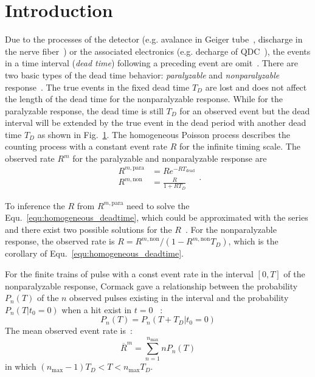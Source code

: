 \section{Introduction}

Due to the processes of the detector (e.g. avalance in Geiger tube~\cite{}, discharge in the nerve fiber~\cite{miller:1985algorithms,bi:1989closedform,}) or the associated electronics (e.g. decharge of QDC~\cite{}), the events in a time interval (\textit{dead time}) following a preceding event are omit~\cite{Knoll:2000fj}. 
There are two basic types of the dead time behavior: \textit{paralyzable} and \textit{nonparalyzable} response~\cite{müller1973deadtime,muller:1994,Knoll:2000fj}. The true events in the fixed dead time $T_D$ are lost and does not affect the length of the dead time for the nonparalyzable response. While for the paralyzable response, the dead time is still $T_D$ for an observed event but the dead interval will be extended by the true event in the dead period with another dead time $T_D$ as shown in Fig.~\ref{}.
The homogeneous Poisson process describes the counting process with a constant event rate $R$ for the infinite timing scale. The observed rate $R^m$ for the paralyzable and nonparalyzable response are~\cite{muller:1994}
\begin{equation}
\begin{aligned}
	R^{m,\mathrm{para}}&=Re^{-RT_\mathrm{dead}}\\
	R^{m,\mathrm{non}}&=\frac{R}{1+RT_D}
\end{aligned}.
\label{equ:homogeneous_deadtime}
\end{equation}

To inference the $R$ from $R^{m,\mathrm{para}}$ need to solve the Equ.~\eqref{equ:homogeneous_deadtime}, which could be approximated with the series and there exist two possible solutions for the $R$~\cite{muller:1994}. 
For the nonparalyzable response, the observed rate is $R=R^{m,\mathrm{non}}/(1-R^{m,\mathrm{non}}T_D)$, which is the corollary of Equ.~\eqref{equ:homogeneous_deadtime}.

For the finite trains of pulse with a const event rate in the interval $[0,T]$ of the nonparalyzable response, Cormack gave a relationship between the probability $P_n(T)$ of the $n$ observed pulses existing in the interval and the probability $P_n(T|t_{0}=0)$ when a hit exist in $t=0$ ~\cite{Cormack:1962}:
\begin{equation}
P_n(T) = P_n(T+T_D|t_{0}=0)
\end{equation}
The mean observed event rate is~\cite{Cormack:1962}:
\begin{equation}
\overline{R}^m=\sum_{n=1}^{n_\mathrm{max}}{nP_n(T)}
\end{equation}
in which $(n_\mathrm{max}-1)T_D<T<n_\mathrm{max}T_D$.

